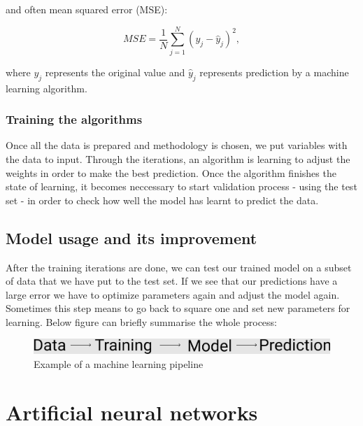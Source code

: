 \documentclass[a4paper,oneside,openright,11pt]{book}
\begin{document}
and often mean squared error (MSE):


\begin{equation}
    MSE = \frac{1}{N}\sum_{j=1}^{N}(y_{j} - \hat{y}_{j})^{2},
\end{equation}


where $y_j$ represents the original value and $\hat{y}_j$ represents prediction by a machine learning algorithm.


\subsubsection{Training the algorithms}

Once all the data is prepared and methodology is chosen, we put variables with the data to input. Through the iterations, an algorithm is learning to adjust the weights in order to make the best prediction. Once the algorithm finishes the state of learning, it becomes neccessary to start validation process - using the test set - in order to check how well the model has learnt to predict the data.



\subsection{Model usage and its improvement}

After the training iterations are done, we can test our trained model on a subset of data that we have put to the test set. If we see that our predictions have a large error we have to optimize parameters again and adjust the model again. Sometimes this step means to go back to square one and set new parameters for learning. Below figure can briefly summarise the whole process:

\begin{figure}[h]
\centering
\includegraphics[scale=0.5]{DocumentFigures/MyFigures/strzalkiver.png}
\caption{Example of a machine learning pipeline \cite{MLpipeline} }
\end{figure}




\section{Artificial neural networks}
\end{document}
